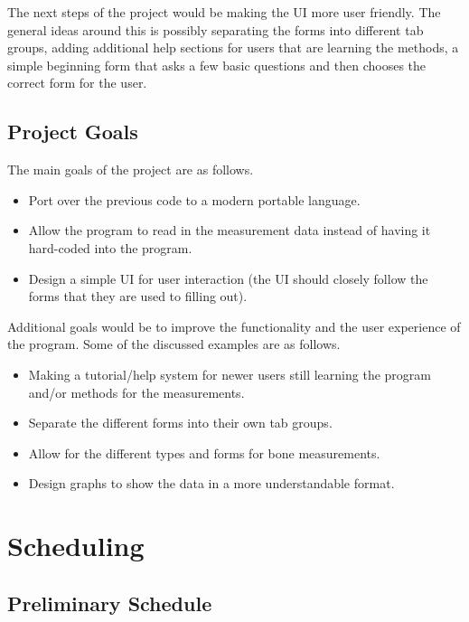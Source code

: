 \documentclass[12pt,letterpaper]{article}
\begin{document}
The next steps of the project would be making the UI more user friendly. The general ideas around this is possibly separating the forms into different tab groups, adding additional help sections for users that are learning the methods, a simple beginning form that asks a few basic questions and then chooses the correct form for the user.

\subsection{Project Goals}

The main goals of the project are as follows.

\begin{itemize}

\item Port over the previous code to a modern portable language.
\item Allow the program to read in the measurement data instead of having it hard-coded into the program.
\item Design a simple UI for user interaction (the UI should closely follow the forms that they are used to filling out).

\end{itemize}

Additional goals would be to improve the functionality and the user experience of the program. Some of the discussed examples are as follows.

\begin{itemize}

\item Making a tutorial/help system for newer users still learning the program and/or methods for the measurements.
\item Separate the different forms into their own tab groups.
\item Allow for the different types and forms for bone measurements.
\item Design graphs to show the data in a more understandable format.
\end{itemize}

\section{Scheduling}

\subsection{Preliminary Schedule}
\end{document}
